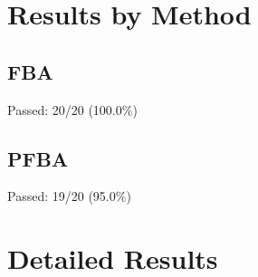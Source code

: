 \documentclass{article}
\begin{document}
\section{Results by Method}

\subsection{FBA}
Passed: 20/20 (100.0\%)

\subsection{PFBA}
Passed: 19/20 (95.0\%)

\section{Detailed Results}
\end{document}
